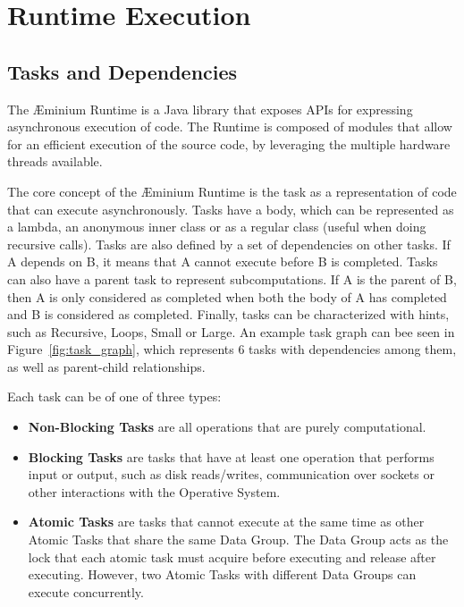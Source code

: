 \documentclass[smallextended]{svjour3}
\begin{document}
\section{Runtime Execution}
\label{sec:runtime}

\subsection{Tasks and Dependencies}

The Æminium Runtime is a Java library that exposes APIs for expressing asynchronous execution of code. The Runtime is composed of modules that allow for an efficient execution of the source code, by leveraging the multiple hardware threads available.

The core concept of the Æminium Runtime is the task as a representation of code that can execute asynchronously. Tasks have a body, which can be represented as a lambda, an anonymous inner class or as a regular class (useful when doing recursive calls). Tasks are also defined by a set of dependencies on other tasks. If A depends on B, it means that A cannot execute before B is completed. Tasks can also have a parent task to represent subcomputations. If A is the parent of B, then A is only considered as completed when both the body of A has completed and B is considered as completed. Finally, tasks can be characterized with hints, such as Recursive, Loops, Small or Large. An example task graph can bee seen in Figure~\ref{fig:task_graph}, which represents 6 tasks with dependencies among them, as well as parent-child relationships.


Each task can be of one of three types:

\begin{itemize}
	\item \textbf{Non-Blocking Tasks} are all operations that are purely computational.
	\item \textbf{Blocking Tasks} are tasks that have at least one operation that performs input or output, such as disk reads/writes, communication over sockets or other interactions with the Operative System.
	\item \textbf{Atomic Tasks} are tasks that cannot execute at the same time as other Atomic Tasks that share the same Data Group. The Data Group acts as the lock that each atomic task must acquire before executing and release after executing. However, two Atomic Tasks with different Data Groups can execute concurrently.
\end{itemize}
\end{document}
